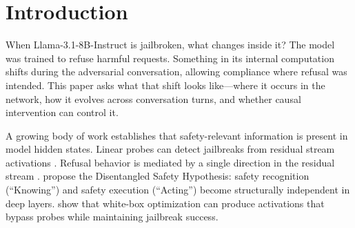 \documentclass[11pt]{article}
\begin{document}
\begin{abstract}
A held-out single-prompt layer sweep places the dominant causal handle at \emph{layer~8}, not the middle of the network: at $\alpha=\pm 0.5\,\|h\|$ the L8 compliance direction suppresses ASR by 49~pp and amplifies it by 9~pp on a 103-prompt held-out test set, both several times stronger than at any other layer tested (L4, L12, L16, L20, L24, L31). Compliance amplification, previously elusive, reproduces under proper controls but is population-bound: on raw harmful prompts (4\% baseline) the L16 direction at $+0.5\,\|h\|$ adds 12~pp, while on laundered breach turns (73\% baseline) the same lever is saturated and amplification only emerges at L8 ($+9$~pp); these are not commensurable (4$\times$ relative lift on raw goals vs.\ 1.12$\times$ on laundered turns, see Section~\ref{sec:causal}). A position-de-confounded refit unlocks an L31 lever (suppresses 30~pp at $\alpha=+0.25\,\|h_{L31}\|$) that the naive direction missed. \citet{arditi2024refusal}'s all-layer ablation does not amplify on Llama-3.1-8B (in contrast to Llama-3.0), but does suppress laundered breach turns by 24~pp.
A focused Network-hacking study (450 malicious + 100 benign-curious conversations, dedicated DPO) reproduces the triple distinction: intent AUC reaches 1.00 at turn~0, compliance AUC caps at 0.72, and DPO lifts ASR from 28\% to 50\% before plateauing at 46\%.
\end{abstract}

\section{Introduction}
\label{sec:intro}

When Llama-3.1-8B-Instruct is jailbroken, what changes inside it?
The model was trained to refuse harmful requests.
Something in its internal computation shifts during the adversarial conversation, allowing compliance where refusal was intended.
This paper asks what that shift looks like---where it occurs in the network, how it evolves across conversation turns, and whether causal intervention can control it.

A growing body of work establishes that safety-relevant information is present in model hidden states.
Linear probes can detect jailbreaks from residual stream activations \citep{jailbreaklens2024}.
Refusal behavior is mediated by a single direction in the residual stream \citep{arditi2024refusal}.
\citet{wu2026knowingwithoutacting} propose the Disentangled Safety Hypothesis: safety recognition (``Knowing'') and safety execution (``Acting'') become structurally independent in deep layers.
\citet{bailey2024obfuscated} show that white-box optimization can produce activations that bypass probes while maintaining jailbreak success.
\end{document}
